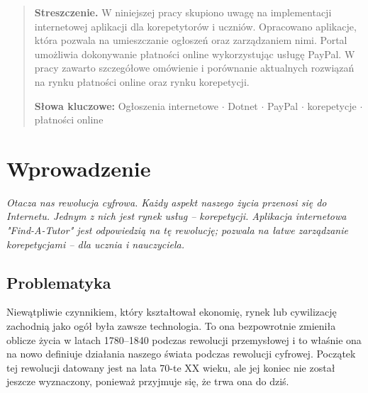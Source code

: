 \documentclass[12pt]{article}
\numberwithin{figure}{section}
\begin{document}
\begin{sloppypar}
\begin{abstract}
\end{abstract}
\begin{abstract}
    
\textbf{Streszczenie.} 
W niniejszej pracy skupiono uwagę na implementacji internetowej aplikacji dla korepetytorów i uczniów.
Opracowano aplikacje, która pozwala na umieszczanie ogłoszeń oraz zarządzaniem nimi. Portal umożliwia dokonywanie płatności online wykorzystując usługę PayPal. W pracy zawarto szczegółowe omówienie i porównanie aktualnych rozwiązań na rynku płatności online oraz rynku korepetycji.
    
\textbf{Słowa kluczowe:}
Ogłoszenia internetowe $\cdot$ Dotnet $\cdot$ PayPal $\cdot$ korepetycje $\cdot$ płatności online

\end{abstract}
\pagebreak
\section{Wprowadzenie}
\textit{Otacza nas rewolucja cyfrowa. Każdy aspekt naszego życia przenosi się do Internetu. Jednym z nich jest rynek usług -- korepetycji. Aplikacja internetowa "Find-A-Tutor" jest odpowiedzią na tę rewolucję; pozwala na łatwe zarządzanie korepetycjami -- dla ucznia i nauczyciela.}
\subsection{Problematyka} \label{sec:problematyka}
Niewątpliwie czynnikiem, który kształtował ekonomię, rynek lub cywilizację zachodnią jako ogół była zawsze technologia. To ona bezpowrotnie zmieniła oblicze życia w latach 1780–1840 podczas rewolucji przemysłowej i to właśnie ona na nowo definiuje działania naszego świata podczas rewolucji cyfrowej. Początek tej rewolucji datowany jest na lata 70-te XX wieku, ale jej koniec nie został jeszcze wyznaczony, ponieważ przyjmuje się, że trwa ona do dziś.


\end{sloppypar}
\end{document}
